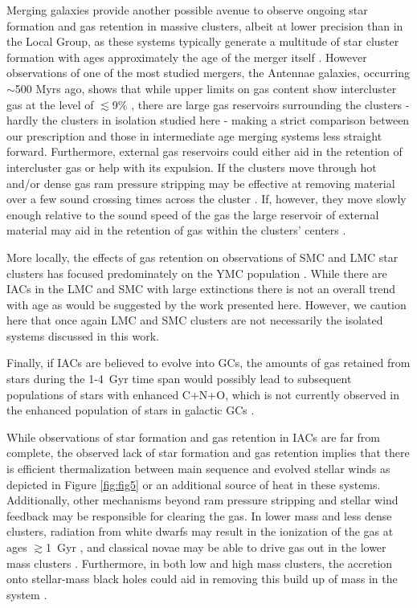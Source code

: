 \documentclass[fleqn,usenatbib]{mnras}
\begin{document}
 Merging galaxies provide another possible avenue to observe ongoing star formation and gas retention in massive clusters, albeit at lower precision than in the Local Group, as these systems typically generate a multitude of star cluster formation with ages approximately the age of the merger itself \citep{whitmore2007}.
 However observations of one of the most studied mergers, the Antennae galaxies, occurring $\sim$500 Myrs ago, shows that while upper limits on gas content show intercluster gas at the level of $\lesssim$9\% \citep{cabrera2015}, there are large gas reservoirs surrounding the clusters \citep{zhu2003} - hardly the clusters in isolation studied here - making a strict comparison between our prescription and those in intermediate age merging systems less straight forward.  
 Furthermore, external gas reservoirs could either aid in the retention of intercluster gas or help with its expulsion.  If the clusters move through hot and/or dense gas ram pressure stripping may be effective at removing material over a few sound crossing times across the cluster \citep{frank1976,naiman2009,desilva2009,martell2009,pancino2010a,naiman2011,priestley2011}.  
 If, however, they move slowly enough relative to the sound speed of the gas the large reservoir of external material may aid in the retention of gas within the clusters' centers \citep{pflamm2009,naiman2011,priestley2011}.

 More locally, the effects of gas retention on observations of SMC and LMC star clusters has focused predominately on the YMC population \citep{bastian2014a,longmore2015}.  
  While there are IACs in the LMC and SMC with large extinctions there is not an overall trend with age \citep{perren2017} as would be suggested by the work presented here.
 However, we caution here that once again LMC and SMC clusters are not necessarily the isolated systems discussed in this work.

 Finally, if IACs are believed to evolve into GCs, the amounts of gas retained from stars during the 1-4~Gyr time span would possibly lead to subsequent populations of stars with enhanced C+N+O, which is not currently observed in the enhanced population of stars in galactic GCs \citep{decressin2009}.

 While observations of star formation and gas retention in IACs are far from complete, the observed lack of star formation and gas retention implies that there is efficient thermalization between main sequence and evolved stellar winds as depicted in Figure \ref{fig:fig5} or an additional source of heat in these systems.
 Additionally, other mechanisms beyond ram pressure stripping and stellar wind feedback may be responsible for clearing the gas.  
 In lower mass and less dense clusters, radiation from white dwarfs may result in the ionization of the gas at ages $\gtrsim$1~Gyr \citep{mcdonald2015}, and classical novae may be able to drive gas out in the lower mass clusters \citep{moore2011}.  
 Furthermore, in both low and high mass clusters, the accretion onto stellar-mass black holes could aid in removing this build up of mass in the system \citep{leigh2013a}.  
\end{document}
